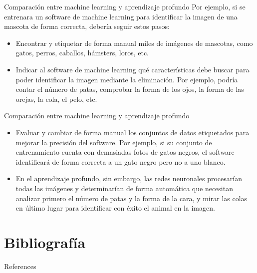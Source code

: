 \documentclass[11pt,aspectratio=169]{beamer}
\begin{document}
\begin{frame}{Comparación entre machine learning y aprendizaje profundo}
	Por ejemplo, si se entrenara un software de machine learning para identificar la imagen de una mascota de forma correcta, 
	debería seguir estos pasos:\pause

	\begin{itemize}
		\item Encontrar y etiquetar de forma manual miles de imágenes de mascotas, como gatos, perros, caballos, hámsters, loros, etc.\pause
		\item Indicar al software de machine learning qué características debe buscar para poder identificar la imagen mediante la eliminación. 
			Por ejemplo, podría contar el número de patas, comprobar la forma de los ojos, la forma de las orejas, la cola, el pelo, etc.
	\end{itemize}	
\end{frame}

\begin{frame}{Comparación entre machine learning y aprendizaje profundo}
	\begin{itemize}
		\item Evaluar y cambiar de forma manual los conjuntos de datos etiquetados para mejorar la precisión del software. 
			Por ejemplo, si su conjunto de entrenamiento cuenta con demasiadas fotos de gatos negros, el software identificará de forma 
			correcta a un gato negro pero no a uno blanco.\pause
		\item En el aprendizaje profundo, sin embargo, las redes neuronales procesarían todas las imágenes y determinarían de forma automática 
			que necesitan analizar primero el número de patas y la forma de la cara, y mirar las colas en último lugar para identificar con 
			éxito el animal en la imagen.
	\end{itemize}	
\end{frame}


\section{Bibliografía}
\begin{frame}[allowframebreaks]{References}
    \nocite{*}
    
    
\end{frame}
\end{document}

